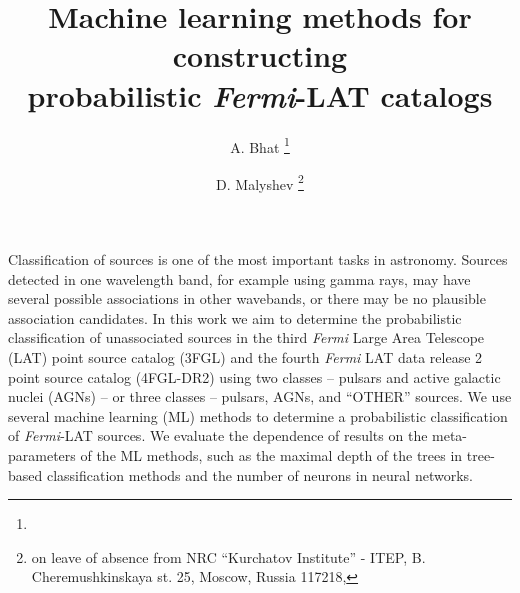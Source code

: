 \documentclass[referee]{aa} %
\newcommand{\Fermi}{\textit{Fermi}\xspace}
\begin{document}
 



   \title{Machine learning methods for constructing \\ probabilistic \Fermi-LAT catalogs}



   \author{A. Bhat \thanks{}
          \and
          D. Malyshev \thanks{on leave of absence from NRC ``Kurchatov Institute'' - ITEP, B. Cheremushkinskaya st. 25, Moscow, Russia 117218, 
          }
          }




 
\abstract
{
Classification of sources is one of the most important tasks in astronomy.
Sources detected in one wavelength band, for example using gamma rays, may have several possible associations in other wavebands, or
there may be no plausible association candidates.
}
{
In this work we aim to determine the probabilistic classification of unassociated sources in the third \Fermi Large Area Telescope (LAT) point source catalog (3FGL) and the fourth \Fermi LAT data release 2 point source catalog (4FGL-DR2) using two classes  -- pulsars and active galactic nuclei (AGNs) -- or three classes -- pulsars, AGNs, and ``OTHER'' sources.
}
{
We use several machine learning (ML) methods to determine a probabilistic classification of \Fermi-LAT sources.
We evaluate the dependence of results on the meta-parameters of the ML methods, such as the maximal depth of the trees in tree-based classification methods and the number of neurons in neural networks.
}
\end{document}
